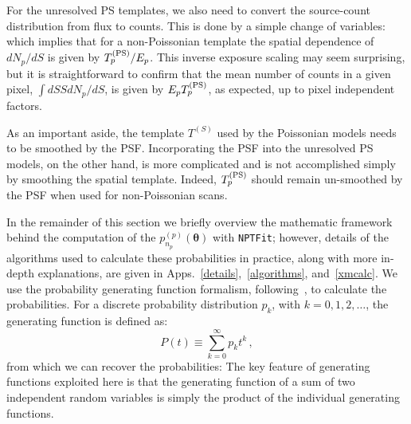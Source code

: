 For the unresolved PS templates, we also need to convert the source-count distribution from flux to counts.  This is done by a simple change of variables:
which implies that for a non-Poissonian template the spatial dependence of $dN_p/dS$ is given by $T^{({\rm PS})}_p/E_p$. This inverse exposure scaling may seem surprising, but it is straightforward to confirm that the mean number of counts in a given pixel, $ \int dS S dN_p / dS$, is given by $E_p T^{({\rm PS})}_p$, as expected, up to pixel independent factors.

As an important aside, the template $T^{(S)}$ used by the Poissonian models needs to be smoothed by the PSF.  Incorporating the PSF into the unresolved PS models, on the other hand, is more complicated and is not accomplished simply by smoothing the spatial template.  Indeed, $T^{({\rm PS})}_p$ should remain un-smoothed by the PSF when used for non-Poissonian scans.



In the remainder of this section we briefly overview the mathematic framework behind the computation of the $p_{n_p}^{(p)}({\bm \theta})$ with \texttt{NPTFit}; however, details of the algorithms used to calculate these probabilities in practice, along with more in-depth explanations, are given in Apps.~\ref{details},~\ref{algorithms}, and~\ref{xmcalc}.  We use the probability generating function formalism, following~\cite{Malyshev:2011zi}, to calculate the probabilities.   
For a discrete probability distribution $p_k$, with $k=0,1,2,\ldots$, the generating function is defined as:
\begin{equation}
P(t) \equiv \sum_{k=0}^{\infty} p_k t^k \,,
\label{prob-gen}
\end{equation}
from which we can recover the probabilities:
The key feature of generating functions exploited here is that the generating function of a sum of two independent random variables is simply the product of the individual generating functions. 


